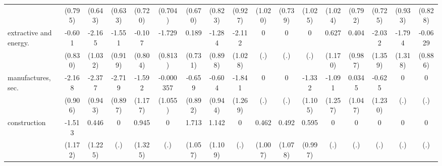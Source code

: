 {\begin{tabular}{l*{16}{c}}
                    &     (0.795)         &     (0.643)         &     (0.633)         &     (0.720)         &     (0.704)         &     (0.670)         &     (0.823)         &     (0.927)         &     (1.020)         &     (0.739)         &     (1.025)         &     (1.024)         &     (0.792)         &     (0.725)         &     (0.933)         &     (0.828)         \\
[1em]
extractive and energy.&      -0.601         &      -2.165\sym{*}  &      -1.551         &      -0.107         &      -1.729\sym{*}  &       0.189         &      -1.284         &      -2.112\sym{*}  &           0         &           0         &           0         &       0.627         &       0.404         &      -2.032         &      -1.794         &     -0.0629         \\
                    &     (0.830)         &     (1.032)         &     (0.919)         &     (0.804)         &     (0.813)         &     (0.731)         &     (0.898)         &     (1.028)         &         (.)         &         (.)         &         (.)         &     (1.170)         &     (0.987)         &     (1.359)         &     (1.318)         &     (0.886)         \\
[1em]
manufactures, sec.  &      -2.168\sym{*}  &      -2.377\sym{*}  &      -2.719\sym{**} &      -1.592         &   -0.000357         &      -0.659         &      -0.604         &      -1.841         &           0         &           0         &      -1.332         &      -1.091         &      0.0345         &      -0.625         &           0         &           0         \\
                    &     (0.906)         &     (0.943)         &     (0.897)         &     (1.177)         &     (1.055)         &     (0.892)         &     (0.944)         &     (1.269)         &         (.)         &         (.)         &     (1.105)         &     (1.257)         &     (1.047)         &     (1.230)         &         (.)         &         (.)         \\
[1em]
construction        &      -1.513         &       0.446         &           0         &       0.945         &           0         &       1.713         &       1.142         &           0         &       0.462         &       0.492         &       0.595         &           0         &           0         &           0         &           0         &           0         \\
                    &     (1.172)         &     (1.225)         &         (.)         &     (1.325)         &         (.)         &     (1.057)         &     (1.109)         &         (.)         &     (1.007)         &     (1.078)         &     (0.997)         &         (.)         &         (.)         &         (.)         &         (.)         &         (.)         \\

\end{tabular}}
